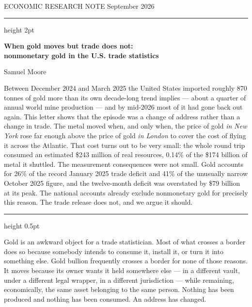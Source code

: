 \documentclass[11pt]{article}
\begin{document}
\pagestyle{empty}

{\sffamily\footnotesize\color{soft} ECONOMIC RESEARCH NOTE \hfill September 2026}

\vspace{4pt}
{\color{rule}\hrule height 2pt}
\vspace{10pt}

{\sffamily\bfseries\LARGE\color{ink}
When gold moves but trade does not:\\ nonmonetary gold in the U.S. trade statistics\par}

\vspace{6pt}
{\sffamily\small\color{soft} Samuel Moore\par}

\vspace{10pt}

{\sffamily\small\color{ink}
Between December 2024 and March 2025 the United States imported roughly 870
tonnes of gold more than its own decade-long trend implies --- about a quarter
of annual world mine production --- and by mid-2026 most of it had gone back
out again. This letter shows that the episode was a change of address rather
than a change in trade. The metal moved when, and only when, the price of gold
\emph{in New York} rose far enough above the price of gold \emph{in London} to
cover the cost of flying it across the Atlantic. That cost turns out to be very
small: the whole round trip consumed an estimated \$243 million of real
resources, 0.14\% of the \$174 billion of metal it shuttled. The measurement
consequences were not small. Gold accounts for 26\% of the record January 2025
trade deficit and 41\% of the unusually narrow October 2025 figure, and the
twelve-month deficit was overstated by \$79 billion at its peak. The national
accounts already exclude nonmonetary gold for precisely this reason. The trade
release does not, and we argue it should.\par}

\vspace{12pt}
{\color{rule}\hrule height 0.5pt}
\vspace{6pt}

Gold is an awkward object for a trade statistician. Most of what crosses a
border does so because somebody intends to consume it, install it, or turn it
into something else. Gold bullion frequently crosses a border for none of those
reasons. It moves because its owner wants it held somewhere else --- in a
different vault, under a different legal wrapper, in a different
jurisdiction --- while remaining, economically, the same asset belonging to the
same person. Nothing has been produced and nothing has been consumed. An address
has changed.
\end{document}
